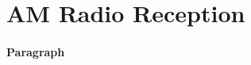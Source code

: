 \documentclass[../main.tex]{subfiles}
\begin{document}
\section{AM Radio Reception}
\barh 

\paragraph{Paragraph}
\end{document}
